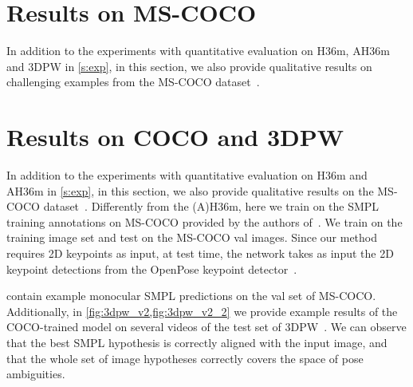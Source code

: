 
\section{Results on MS-COCO} \label{s:supp_qual}
In addition to the experiments with quantitative evaluation on H36m, AH36m and 3DPW in \cref{s:exp}, in this section, we also provide qualitative results on challenging examples from the MS-COCO dataset~\cite{lin2014microsoft}.



\section{Results on COCO and 3DPW}
In addition to the experiments with quantitative evaluation on H36m and AH36m in \cref{s:exp}, in this section, we also provide qualitative results on the MS-COCO dataset~\cite{lin2014microsoft}. Differently from the (A){}H36m, here we train on the SMPL training annotations on MS-COCO provided by the authors of~\cite{kolotouros19learning}. We train on the training image set and test on the MS-COCO val images. Since our method requires 2D keypoints as input, at test time, the network takes as input the 2D keypoint detections from the OpenPose keypoint detector~\cite{cao2018openpose}.

 contain example monocular SMPL predictions on the val set of MS-COCO\@.
Additionally, in \cref{fig:3dpw_v2,fig:3dpw_v2_2} we provide example results of the COCO-trained model on several videos of the test set of 3DPW~\cite{vonmarcard2018recovering}. We can observe that the best SMPL hypothesis is correctly aligned with the input image, and that the whole set of image hypotheses correctly covers the space of pose ambiguities.



% 

\clearpage
{\small}
